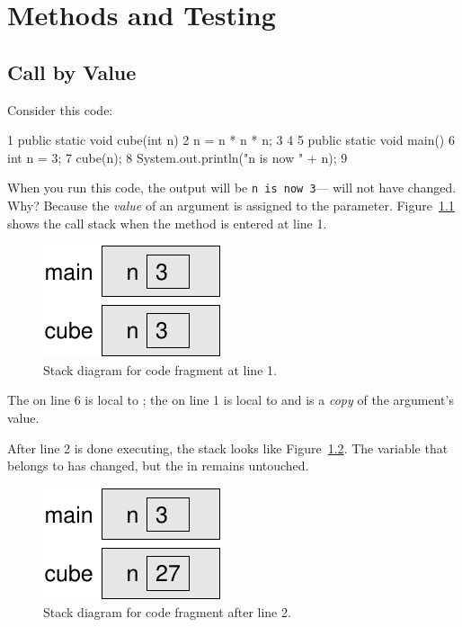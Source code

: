 \chapter{Methods and Testing}

\section{Call by Value}

Consider this code:

\begin{code}
 1 public static void cube(int n) {
 2     n = n * n * n;
 3 }
 4
 5 public static void main() {
 6     int n = 3;
 7     cube(n);
 8     System.out.println("n is now " + n);
 9 }
\end{code}

When you run this code, the output will be \texttt{n is now 3}--- will not have changed. Why? Because the {\em value} of an argument is assigned to the parameter. Figure~\ref{fig.value1} shows the call stack when the  method is entered at line 1.

\begin{figure}[!ht]
\begin{center}
\includegraphics{figs/ch04/call_by_value1.pdf}
\caption{Stack diagram for code fragment at line 1.}
\label{fig.value1}
\end{center}
\end{figure}

The  on line 6 is local to ; the  on line 1 is local to  and is a {\em copy} of the argument's value.

After line 2 is done executing, the stack looks like Figure~\ref{fig.value2}.  The variable  that belongs to  has changed, but the  in  remains untouched.

\begin{figure}[!ht]
\begin{center}
\includegraphics{figs/ch04/call_by_value2.pdf}
\caption{Stack diagram for code fragment after line 2.}
\label{fig.value2}
\end{center}
\end{figure}

